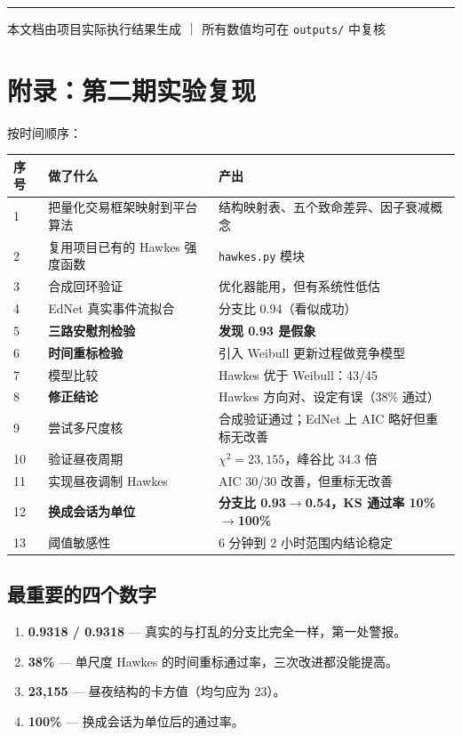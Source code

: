 \documentclass[UTF8,a4paper,11pt]{ctexart}
\begin{document}
\vspace{12pt}
\hrule
\vspace{6pt}
\begin{center}
\small 本文档由项目实际执行结果生成 ｜ 所有数值均可在 \texttt{outputs/} 中复核
\end{center}




\section{附录：第二期实验复现}

按时间顺序：

\begin{longtable}{@{}p{0.8cm}p{6.2cm}p{6.8cm}@{}}
\toprule
\textbf{序号} & \textbf{做了什么} & \textbf{产出} \\
\midrule
1 & 把量化交易框架映射到平台算法 & 结构映射表、五个致命差异、因子衰减概念 \\
2 & 复用项目已有的 Hawkes 强度函数 & \texttt{hawkes.py} 模块 \\
3 & 合成回环验证 & 优化器能用，但有系统性低估 \\
4 & EdNet 真实事件流拟合 & 分支比 0.94（看似成功） \\
5 & \textbf{三路安慰剂检验} & \textbf{发现 0.93 是假象} \\
6 & \textbf{时间重标检验} & 引入 Weibull 更新过程做竞争模型 \\
7 & 模型比较 & Hawkes 优于 Weibull：43/45 \\
8 & \textbf{修正结论} & Hawkes 方向对、设定有误（38\% 通过） \\
9 & 尝试多尺度核 & 合成验证通过；EdNet 上 AIC 略好但重标无改善 \\
10 & 验证昼夜周期 & $\chi^2=23{,}155$，峰谷比 34.3 倍 \\
11 & 实现昼夜调制 Hawkes & AIC 30/30 改善，但重标无改善 \\
12 & \textbf{换成会话为单位} & \textbf{分支比 0.93$\to$0.54，KS 通过率 10\%$\to$100\%} \\
13 & 阈值敏感性 & 6 分钟到 2 小时范围内结论稳定 \\
\bottomrule
\end{longtable}

\subsection{最重要的四个数字}

\begin{enumerate}[leftmargin=2em]
\item \textbf{0.9318 / 0.9318} --- 真实的与打乱的分支比完全一样，第一处警报。
\item \textbf{38\%} --- 单尺度 Hawkes 的时间重标通过率，三次改进都没能提高。
\item \textbf{23,155} --- 昼夜结构的卡方值（均匀应为 23）。
\item \textbf{100\%} --- 换成会话为单位后的通过率。
\end{enumerate}
\end{document}
